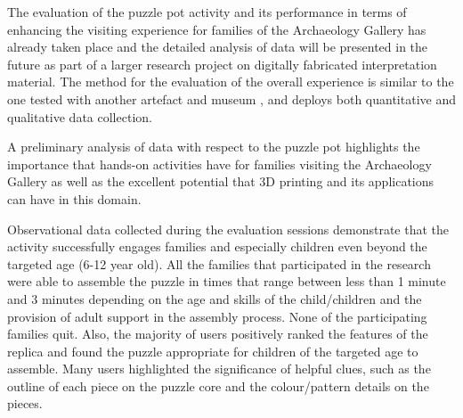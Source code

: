 \documentclass[acmlarge,screen,dvipsnames]{acmart}
\begin{document}
%
%
\greenBegin%
The evaluation of the puzzle pot activity 
and its performance in terms of enhancing the visiting experience for families 
of the Archaeology Gallery has already taken place and the detailed analysis 
of data will be presented in the future as part of a larger research project 
on digitally fabricated interpretation material. The method for the evaluation 
of the overall experience is similar to the one tested with another artefact 
and museum \cite{Samaroudi2017},\cite{10.1007/978-3-030-23089-0_7} and deploys both 
quantitative and qualitative data collection.


A preliminary analysis of data with respect to the puzzle 
pot highlights the importance that hands-on activities have for families 
visiting the Archaeology Gallery as well as the excellent potential 
that 3D printing and its applications can have in this domain. 

Observational data collected during the evaluation sessions
demonstrate that the activity successfully engages families and
especially children even beyond the targeted age (6-12 year old). All
the families that participated in the research were able to assemble
the puzzle in times that range between less than 1 minute and 3 minutes
depending on the age and skills of the child/children and the
provision of adult support in the assembly process. None of the
participating families quit. Also, the majority of users positively
ranked the features of the replica and found the puzzle appropriate
for children of the targeted age to assemble. Many users highlighted
the significance of helpful clues, such as the outline of each piece
on the puzzle core and the colour/pattern details on the pieces. 
\end{document}
